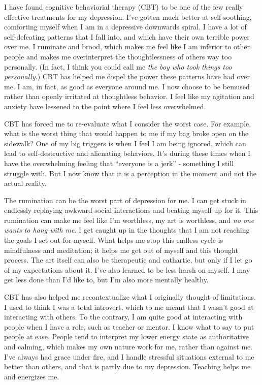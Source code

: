 \documentclass[
]{book}
\begin{document}
I have found cognitive behaviorial therapy (CBT) to be one of the few really effective treatments for my depression. I've gotten much better at self-soothing, comforting myself when I am in a depressive downwards spiral. I have a lot of self-defeating patterns that I fall into, and which have their own terrible power over me. I ruminate and brood, which makes me feel like I am inferior to other people and makes me overinterpret the thoughtlessness of others way too personally. (In fact, I think you could call me \emph{the boy who took things too personally}.) CBT has helped me dispel the power these patterns have had over me. I am, in fact, as good as everyone around me. I now choose to be bemused rather than openly irritated at thoughtless behavior. I feel like my agitation and anxiety have lessened to the point where I feel less overwhelmed.

CBT has forced me to re-evaluate what I consider the worst case. For example, what is the worst thing that would happen to me if my bag broke open on the sidewalk? One of my big triggers is when I feel I am being ignored, which can lead to self-destructive and alienating behaviors. It's during these times when I have the overwhelming feeling that ``everyone is a jerk'' - something I still struggle with. But I now know that it is a perception in the moment and not the actual reality.

The rumination can be the worst part of depression for me. I can get stuck in endlessly replaying awkward social interactions and beating myself up for it. This rumination can make me feel like I'm worthless, my art is worthless, and \emph{no one wants to hang with me}. I get caught up in the thoughts that I am not reaching the goals I set out for myself. What helps me stop this endless cycle is mindfulness and meditation; it helps me get out of myself and this thought process. The art itself can also be therapeutic and cathartic, but only if I let go of my expectations about it. I've also learned to be less harsh on myself. I may get less done than I'd like to, but I'm also more mentally healthy.

CBT has also helped me recontextualize what I originally thought of limitations. I used to think I was a total introvert, which to me meant that I wasn't good at interacting with others. To the contrary, I am quite good at interacting with people when I have a role, such as teacher or mentor. I know what to say to put people at ease. People tend to interpret my lower energy state as authoritative and calming, which makes my own nature work for me, rather than against me. I've always had grace under fire, and I handle stressful situations external to me better than others, and that is partly due to my depression. Teaching helps me and energizes me.
\end{document}
